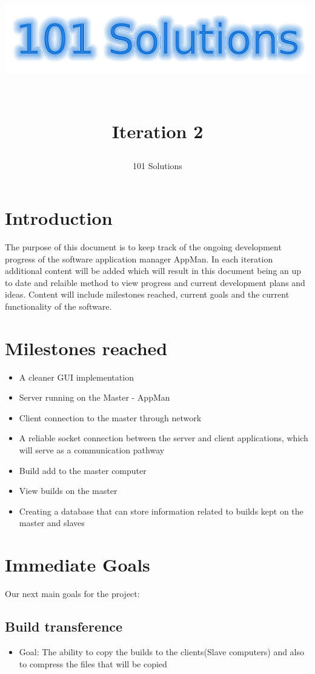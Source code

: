 \documentclass[a4paper,12pt,final]{article}
\title{
\begin{center}
  	\includegraphics[scale=0.3]{Logo.png} 
  \end{center}
  \textbf{\\}
Iteration 2\\
}
\author{101 Solutions}
\begin{document}
\maketitle
\thispagestyle{empty}
\newpage
\tableofcontents
\thispagestyle{empty}
\newpage
{}

\section{Introduction}
The purpose of this document is to keep track of the ongoing development progress of the software application manager AppMan.  In each iteration additional content will be added which will result in this document being an up to date and relaible method to view progress and current development plans and ideas. Content will include milestones reached, current goals and the current functionality of the software.

\section{Milestones reached}
\begin{itemize}
\item A cleaner GUI implementation
\item Server running on the Master - AppMan
\item Client connection to the master through network
\item A reliable socket connection between the server and client applications, which will serve as a communication pathway
\item Build add to the master computer
\item View builds on the master
\item Creating a database that can store information related to builds kept on the master and slaves
\end{itemize}


\section{Immediate Goals}
Our next main goals for the project:
\subsection{Build transference}
\begin{itemize}
\item Goal: The ability to copy the builds to the clients(Slave computers) and also to compress the files that will be copied
\end{itemize}
\end{document}
